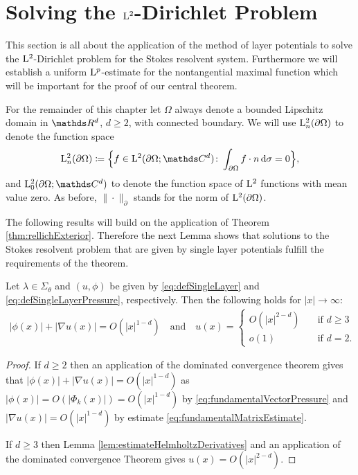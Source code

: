 \chapter{Solving the $\mathrm{L}^2$-Dirichlet Problem}
\label{chap:5}

This section is all about the application of the method of layer potentials to solve the $\mathrm{L}^2$-Dirichlet problem for the Stokes resolvent system.
Furthermore we will establish a uniform $\mathrm{L}^p$-estimate for the nontangential maximal function which will be important for the proof of our central theorem.

For the remainder of this chapter let $\Omega$ always denote a bounded Lipschitz domain in $\R^d$, $d \geq 2$, with connected boundary.
We will use $\mathrm{L}^2_n(\partial\Omega)$ to denote the function space
\begin{align*}
  \Ell^2_n(\partial\Omega) \coloneqq \Big\{ f \in \Ell^2(\partial\Omega; \C^d) \colon \int_{\partial\Omega} f \cdot n \d \sigma = 0 \Big\},
\end{align*}
and $\Ell_0^2(\partial\Omega; \C^d)$  to denote the function space of $\mathrm{L}^2$ functions with mean value zero.
As before, $\| \cdot \|_\partial$ stands for the norm of $\mathrm{L}^2(\partial\Omega)$.

The following results will build on the application of Theorem \ref{thm:rellichExterior}.
Therefore the next Lemma shows that solutions to the Stokes resolvent problem that are given by single layer potentials fulfill the requirements of the theorem.

\begin{lem}
  \label{lem:requirements}
  Let $\lambda \in \Sigma_\theta$ and $(u,\phi)$ be given by \eqref{eq:defSingleLayer} and \eqref{eq:defSingleLayerPressure}, respectively.
  Then the following holds for $|x| \to \infty$:
  \begin{align*}
    |\phi(x)| + |\nabla u(x)| = O(|x|^{1 - d}) \quad\text{and}\quad 
    u(x) = \begin{cases} O(|x|^{2 - d}) &\quad\text{if } d \geq 3 \\ o(1) &\quad\text{if } d = 2. \end{cases}
  \end{align*}
\end{lem}

\begin{proof}
  If $d \geq 2$ then an application of the dominated convergence theorem gives that $|\phi(x)| + |\nabla u(x)| = O(|x|^{1 - d})$ as $|\phi(x)| = O(|\Phi_k(x)|) = O(|x|^{1 - d})$ by \eqref{eq:fundamentalVectorPressure} and $|\nabla u(x)| = O(|x|^{1 - d})$ by estimate \ref{eq:fundamentalMatrixEstimate}.

  If $d \geq 3$ then Lemma \ref{lem:estimateHelmholtzDerivatives} and an application of the dominated convergence Theorem gives $u(x) = O(|x|^{2 - d})$.
\end{proof}

